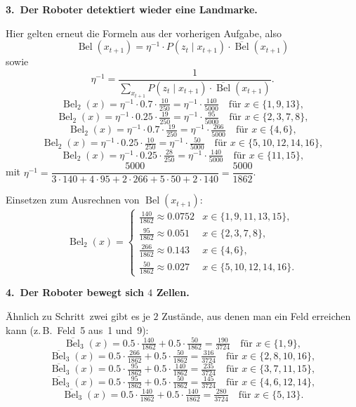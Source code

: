 \documentclass[11pt,a4paper]{article}
\newcommand{\Bel}{\operatorname{Bel}}
\newcommand{\pBel}{\overline{\operatorname{Bel}}}
\begin{document}
\textbf{3.\ Der Roboter detektiert wieder eine Landmarke.}

Hier gelten erneut die Formeln aus der vorherigen Aufgabe, also
\[
  \Bel(x_{t+1}) = \eta^{-1}\cdot P(z_t\mid x_{t+1})\cdot \pBel(x_{t+1})
\]
sowie
\[
  \eta^{-1} = \dfrac{1}{\sum_{x_{t+1}} P(z_t\mid x_{t+1})\cdot \pBel(x_{t+1})}.
\]
\[
  \Bel_2(x) = \eta^{-1}\cdot 0.7\cdot\tfrac{10}{250} = \eta^{-1}\cdot\tfrac{140}{5000}
  \quad\text{für } x\in\{1,9,13\},
\]
\[
  \Bel_2(x) = \eta^{-1}\cdot 0.25\cdot\tfrac{19}{250} = \eta^{-1}\cdot\tfrac{95}{5000}
  \quad\text{für } x\in\{2,3,7,8\},
\]
\[
  \Bel_2(x) = \eta^{-1}\cdot 0.7\cdot\tfrac{19}{250} = \eta^{-1}\cdot\tfrac{266}{5000}
  \quad\text{für } x\in\{4,6\},
\]
\[
  \Bel_2(x) = \eta^{-1}\cdot 0.25\cdot\tfrac{10}{250} = \eta^{-1}\cdot\tfrac{50}{5000}
  \quad\text{für } x\in\{5,10,12,14,16\},
\]
\[
  \Bel_2(x) = \eta^{-1}\cdot 0.25\cdot\tfrac{28}{250} = \eta^{-1}\cdot\tfrac{140}{5000}
  \quad\text{für } x\in\{11,15\},
\]
mit $\eta^{-1} = \dfrac{5000}{3\cdot 140 + 4\cdot 95 + 2\cdot 266 + 5\cdot 50 + 2\cdot 140}
= \dfrac{5000}{1862}$.

Einsetzen zum Ausrechnen von $\Bel(x_{t+1})$:
\[
  \Bel_2(x) =
  \begin{cases}
    \tfrac{140}{1862}\approx 0.0752 & x\in\{1,9,11,13,15\},\\[0.3em]
    \tfrac{95}{1862}\approx 0.051   & x\in\{2,3,7,8\},\\[0.3em]
    \tfrac{266}{1862}\approx 0.143  & x\in\{4,6\},\\[0.3em]
    \tfrac{50}{1862}\approx 0.027   & x\in\{5,10,12,14,16\}.
  \end{cases}
\]

\textbf{4.\ Der Roboter bewegt sich $4$ Zellen.}

Ähnlich zu Schritt~zwei gibt es je $2$ Zustände, aus denen man ein Feld erreichen kann
(z.\,B.\ Feld~5 aus~1 und~9):
\[
  \pBel_3(x) = 0.5\cdot\tfrac{140}{1862} + 0.5\cdot\tfrac{50}{1862} = \tfrac{190}{3724}
  \quad\text{für } x\in\{1,9\},
\]
\[
  \pBel_3(x) = 0.5\cdot\tfrac{266}{1862} + 0.5\cdot\tfrac{50}{1862} = \tfrac{316}{3724}
  \quad\text{für } x\in\{2,8,10,16\},
\]
\[
  \pBel_3(x) = 0.5\cdot\tfrac{95}{1862} + 0.5\cdot\tfrac{140}{1862} = \tfrac{235}{3724}
  \quad\text{für } x\in\{3,7,11,15\},
\]
\[
  \pBel_3(x) = 0.5\cdot\tfrac{95}{1862} + 0.5\cdot\tfrac{50}{1862} = \tfrac{145}{3724}
  \quad\text{für } x\in\{4,6,12,14\},
\]
\[
  \pBel_3(x) = 0.5\cdot\tfrac{140}{1862} + 0.5\cdot\tfrac{140}{1862} = \tfrac{280}{3724}
  \quad\text{für } x\in\{5,13\}.
\]
\end{document}
